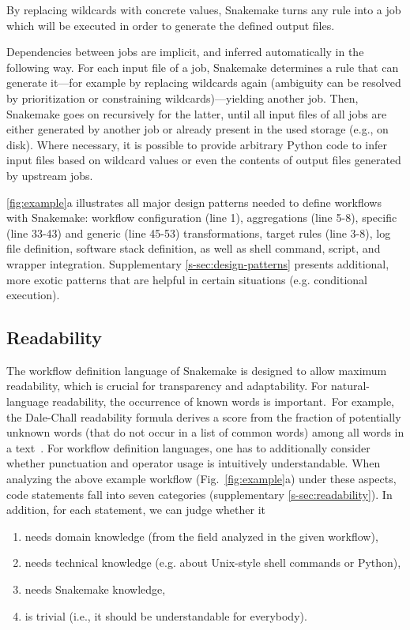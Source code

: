 \documentclass[parskip=half, DIV=18]{scrartcl}
\begin{document}
By replacing wildcards with concrete values, Snakemake turns any rule into a job which will be executed in order to generate the defined output files.

Dependencies between jobs are implicit, and inferred automatically in the following way.
For each input file of a job, Snakemake determines a rule that can generate it---for example by replacing wildcards again (ambiguity can be resolved by prioritization or constraining wildcards)---yielding another job.
Then, Snakemake goes on recursively for the latter, until all input files of all jobs are either generated by another job or already present in the used storage (e.g., on disk).
Where necessary, it is possible to provide arbitrary Python code to infer input files based on wildcard values or even the contents of output files generated by upstream jobs.

\autoref{fig:example}a illustrates all major design patterns needed to define workflows with Snakemake: workflow configuration (line 1), aggregations (line 5-8), specific (line 33-43) and generic (line 45-53) transformations, target rules (line 3-8), log file definition, software stack definition, as well as shell command, script, and wrapper integration.
Supplementary \autoref{s-sec:design-patterns} presents additional, more exotic patterns that are helpful in certain situations (e.g. conditional execution).

\subsection{Readability}

The workflow definition language of Snakemake is designed to allow maximum readability, which is crucial for transparency and adaptability.
For natural-language readability, the occurrence of known words is important.~For example, the Dale-Chall readability formula derives a score from the fraction of potentially unknown words (that do not occur in a list of common words) among all words in a text~\parencite{chall_readability_1995}.
For workflow definition languages, one has to additionally consider whether punctuation and operator usage is intuitively understandable.
When analyzing the above example workflow (Fig.~\ref{fig:example}a) under these aspects, code statements fall into seven categories (supplementary \autoref{s-sec:readability}).
In addition, for each statement, we can judge whether it

\begin{enumerate}
	\item needs domain knowledge (from the field analyzed in the given workflow),
	\item needs technical knowledge (e.g. about Unix-style shell commands or Python),
	\item needs Snakemake knowledge,
	\item is trivial (i.e., it should be understandable for everybody).
\end{enumerate}
\end{document}
